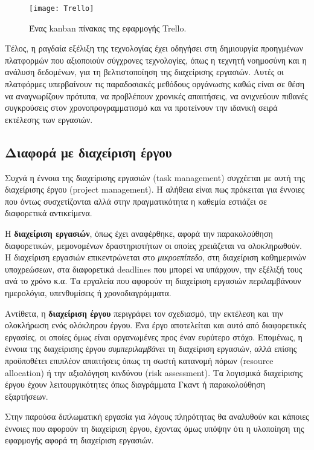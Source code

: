             \begin{figure}[h!] \noindent \centering
                \texttt{[image: Trello]}
                \caption{Ένας kanban πίνακας της εφαρμογής Trello.}
            \end{figure}

            Τέλος, η ραγδαία εξέλιξη της τεχνολογίας έχει οδηγήσει στη δημιουργία προηγμένων πλατφορμών που αξιοποιούν σύγχρονες τεχνολογίες, όπως η τεχνητή νοημοσύνη και η ανάλυση δεδομένων, για τη βελτιστοποίηση της διαχείρισης εργασιών. Αυτές οι πλατφόρμες υπερβαίνουν τις παραδοσιακές μεθόδους οργάνωσης καθώς είναι σε θέση να αναγνωρίζουν πρότυπα, να προβλέπουν χρονικές απαιτήσεις, να ανιχνεύουν πιθανές συγκρούσεις στον χρονοπρογραμματισμό και να προτείνουν την ιδανική σειρά εκτέλεσης των εργασιών.

        \subsection{Διαφορά με διαχείριση έργου}
            Συχνά η έννοια της διαχείρισης εργασιών (task management) συγχέεται με αυτή της διαχείρισης έργου (project management). Η αλήθεια είναι πως πρόκειται για έννοιες που όντως συσχετίζονται αλλά στην πραγματικότητα η καθεμία εστιάζει σε διαφορετικά αντικείμενα.

            Η \textbf{διαχείριση εργασιών}, όπως έχει αναφέρθηκε, αφορά την παρακολούθηση διαφορετικών, μεμονομένων δραστηριοτήτων οι οποίες χρειάζεται να ολοκληρωθούν. Η διαχείριση εργασιών επικεντρώνεται στο \textit{μικροεπίπεδο}, στη διαχείριση καθημερινών υποχρεώσεων, στα διαφορετικά deadlines που μπορεί να υπάρχουν, την εξέλιξή τους ανά το χρόνο κ.α. Τα εργαλεία που αφορούν τη διαχείριση εργασιών περιλαμβάνουν ημερολόγια, υπενθυμίσεις ή χρονοδιαγράμματα.

            Αντίθετα, η \textbf{διαχείριση έργου} περιγράφει τον σχεδιασμό, την εκτέλεση και την ολοκλήρωση ενός ολόκληρου έργου. Ένα έργο αποτελείται και αυτό από διαφορετικές εργασίες, οι οποίες όμως είναι οργανωμένες προς έναν ευρύτερο στόχο. Επομένως, η έννοια της διαχείρισης έργου \textit{συμπεριλαμβάνει} τη διαχείριση εργασιών, αλλά επίσης προϋποθέτει επιπλέον απαιτήσεις όπως τη σωστή κατανομή πόρων (resource allocation) ή την αξιολόγηση κινδύνου (risk assessment). Τα λογισμικά διαχείρισης έργου έχουν λειτουργικότητες όπως διαγράμματα Γκαντ ή παρακολούθηση εξαρτήσεων.

            Στην παρούσα διπλωματική εργασία για λόγους πληρότητας θα αναλυθούν και κάποιες έννοιες που αφορούν τη διαχείριση έργου, έχοντας όμως υπόψην ότι η υλοποίηση της εφαρμογής αφορά τη διαχείριση εργασιών.

